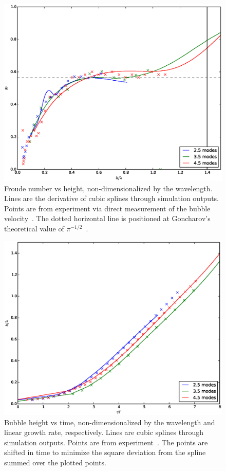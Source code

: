 \begin{figure}
\includegraphics[width=\columnwidth]{plts/Fr}
\caption{  
Froude number vs height, non-dimensionalized by the wavelength.
Lines are the derivative of cubic splines through simulation outputs.
Points are from experiment via direct measurement of the bubble velocity~\cite{JacobsPrivate}.
The dotted horizontal line is positioned at Goncharov's theoretical value of $\pi^{-1/2}$~\cite{Goncharov2002}.
}
\end{figure}

\begin{figure}
\includegraphics[width=\columnwidth]{plts/aspect}
\caption{  
Bubble height vs time, non-dimensionalized by the wavelength and linear growth rate, respectively.
Lines are cubic splines through simulation outputs.
Points are from experiment~\cite{JacobsPrivate}.
The points are shifted in time to minimize the square deviation from the spline summed over the plotted points.
}
\end{figure}

